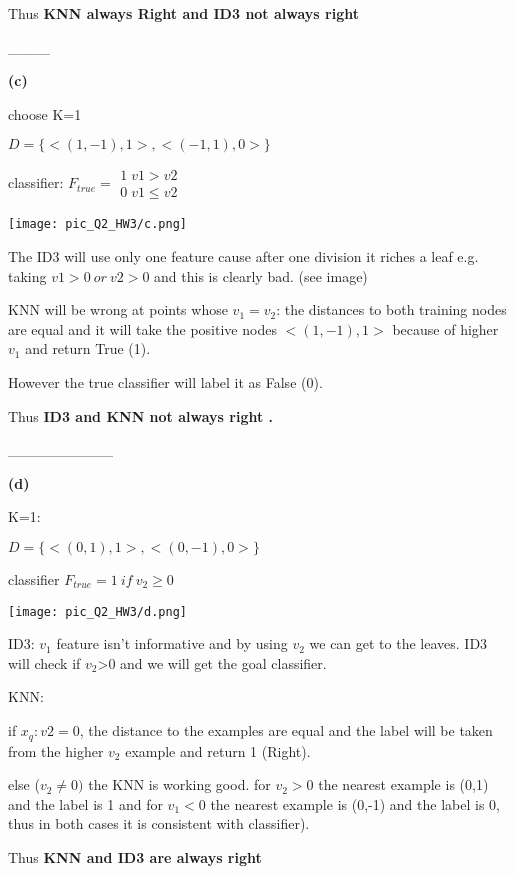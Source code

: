 Thus \textbf{KNN always Right and ID3 not always right}

\_\_\_\_

\textbf{(c) }

choose K=1

$D=\{<(1,-1),1>,<(-1,1),0>\}$

classifier: $F_{true}=\begin{array}{c}
1\;v1>v2\\
0\;v1\leq v2
\end{array}$

\texttt{[image: pic\_Q2\_HW3/c.png]}

The ID3 will use only one feature cause after one division it riches
a leaf e.g. taking $v1>0\ or\ v2>0$ and this is clearly bad. (see
image)

KNN will be wrong at points whose $v_{1}=v_{2}$: the distances to
both training nodes are equal and it will take the positive nodes
$<(1,-1),1>$ because of higher $v_{1}$ and return True (1).

However the true classifier will label it as False (0).

Thus \textbf{ID3 and KNN not always right .}

\_\_\_\_\_\_\_\_\_\_

\textbf{(d)}

K=1:

$D=\{<(0,1),1>,<(0,-1),0>\}$

classifier $F_{true}=1\ if\ v_{2}\geq0$

\texttt{[image: pic\_Q2\_HW3/d.png]}

ID3: $v_{1}$ feature isn't informative and by using $v_{2}$ we can
get to the leaves. ID3 will check if $v_{2}$>0 and we will get the
goal classifier.

KNN:

if $x_{q}:v2=0$, the distance to the examples are equal and the label
will be taken from the higher $v_{2}$ example and return 1 (Right).

else ($v_{2}\neq0)$ the KNN is working good. for $v_{2}>0$ the nearest
example is (0,1) and the label is 1 and for $v_{1}<0$ the nearest
example is (0,-1) and the label is 0, thus in both cases it is consistent
with classifier).

Thus \textbf{KNN and ID3 are always right}
